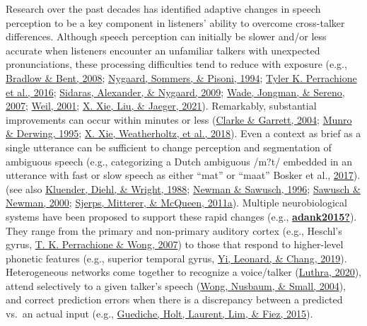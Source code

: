 \documentclass[
  11pt,
  man,floatsintext]{apa6}
\begin{document}
Research over the past decades has identified adaptive changes in speech perception to be a key component in listeners' ability to overcome cross-talker differences. Although speech perception can initially be slower and/or less accurate when listeners encounter an unfamiliar talkers with unexpected pronunciations, these processing difficulties tend to reduce with exposure (e.g., \protect\hyperlink{ref-bradlow-bent2008}{Bradlow \& Bent, 2008}; \protect\hyperlink{ref-nygaard1994}{Nygaard, Sommers, \& Pisoni, 1994}; \protect\hyperlink{ref-Perrachione2016}{Tyler K. Perrachione et al., 2016}; \protect\hyperlink{ref-sidaras2009}{Sidaras, Alexander, \& Nygaard, 2009}; \protect\hyperlink{ref-wade2007}{Wade, Jongman, \& Sereno, 2007}; \protect\hyperlink{ref-weil2001a}{Weil, 2001}; \protect\hyperlink{ref-xie2021jep}{X. Xie, Liu, \& Jaeger, 2021}). Remarkably, substantial improvements can occur within minutes or less (\protect\hyperlink{ref-clarke-garrett2004}{Clarke \& Garrett, 2004}; \protect\hyperlink{ref-munro-derwing1995}{Munro \& Derwing, 1995}; \protect\hyperlink{ref-xie2018jasa}{X. Xie, Weatherholtz, et al., 2018}). Even a context as brief as a single utterance can be sufficient to change perception and segmentation of ambiguous speech (e.g., categorizing a Dutch ambiguous /m?t/ embedded in an utterance with fast or slow speech as either ``mat'' or ``maat'' Bosker et al., \protect\hyperlink{ref-bosker2017}{2017}). (see also \protect\hyperlink{ref-kluender1988}{Kluender, Diehl, \& Wright, 1988}; \protect\hyperlink{ref-newman-sawusch1996}{Newman \& Sawusch, 1996}; \protect\hyperlink{ref-sawusch-newman2000}{Sawusch \& Newman, 2000}; \protect\hyperlink{ref-sjerps2011}{Sjerps, Mitterer, \& McQueen, 2011a}). Multiple neurobiological systems have been proposed to support these rapid changes (e.g., \protect\hyperlink{ref-adank2015}{\textbf{adank2015?}}). They range from the primary and non-primary auditory cortex (e.g., Heschl's gyrus, \protect\hyperlink{ref-Perrachione2007}{T. K. Perrachione \& Wong, 2007}) to those that respond to higher-level phonetic features (e.g., superior temporal gyrus, \protect\hyperlink{ref-Yi2019}{Yi, Leonard, \& Chang, 2019}). Heterogeneous networks come together to recognize a voice/talker (\protect\hyperlink{ref-luthra2020b}{Luthra, 2020}), attend selectively to a given talker's speech (\protect\hyperlink{ref-wong2004}{Wong, Nusbaum, \& Small, 2004}), and correct prediction errors when there is a discrepancy between a predicted vs.~an actual input (e.g., \protect\hyperlink{ref-guediche2015evidence}{Guediche, Holt, Laurent, Lim, \& Fiez, 2015}).
\end{document}
